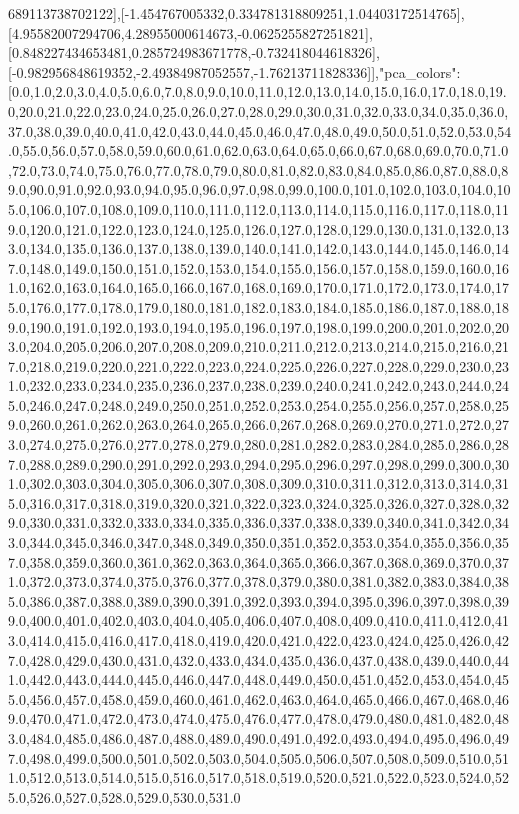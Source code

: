 \documentclass{article}
\begin{document}
689113738702122],[-1.454767005332,0.334781318809251,1.04403172514765],[4.95582007294706,4.28955000614673,-0.0625255827251821],[0.848227434653481,0.285724983671778,-0.732418044618326],[-0.982956848619352,-2.49384987052557,-1.76213711828336]],"pca_colors":[0.0,1.0,2.0,3.0,4.0,5.0,6.0,7.0,8.0,9.0,10.0,11.0,12.0,13.0,14.0,15.0,16.0,17.0,18.0,19.0,20.0,21.0,22.0,23.0,24.0,25.0,26.0,27.0,28.0,29.0,30.0,31.0,32.0,33.0,34.0,35.0,36.0,37.0,38.0,39.0,40.0,41.0,42.0,43.0,44.0,45.0,46.0,47.0,48.0,49.0,50.0,51.0,52.0,53.0,54.0,55.0,56.0,57.0,58.0,59.0,60.0,61.0,62.0,63.0,64.0,65.0,66.0,67.0,68.0,69.0,70.0,71.0,72.0,73.0,74.0,75.0,76.0,77.0,78.0,79.0,80.0,81.0,82.0,83.0,84.0,85.0,86.0,87.0,88.0,89.0,90.0,91.0,92.0,93.0,94.0,95.0,96.0,97.0,98.0,99.0,100.0,101.0,102.0,103.0,104.0,105.0,106.0,107.0,108.0,109.0,110.0,111.0,112.0,113.0,114.0,115.0,116.0,117.0,118.0,119.0,120.0,121.0,122.0,123.0,124.0,125.0,126.0,127.0,128.0,129.0,130.0,131.0,132.0,133.0,134.0,135.0,136.0,137.0,138.0,139.0,140.0,141.0,142.0,143.0,144.0,145.0,146.0,147.0,148.0,149.0,150.0,151.0,152.0,153.0,154.0,155.0,156.0,157.0,158.0,159.0,160.0,161.0,162.0,163.0,164.0,165.0,166.0,167.0,168.0,169.0,170.0,171.0,172.0,173.0,174.0,175.0,176.0,177.0,178.0,179.0,180.0,181.0,182.0,183.0,184.0,185.0,186.0,187.0,188.0,189.0,190.0,191.0,192.0,193.0,194.0,195.0,196.0,197.0,198.0,199.0,200.0,201.0,202.0,203.0,204.0,205.0,206.0,207.0,208.0,209.0,210.0,211.0,212.0,213.0,214.0,215.0,216.0,217.0,218.0,219.0,220.0,221.0,222.0,223.0,224.0,225.0,226.0,227.0,228.0,229.0,230.0,231.0,232.0,233.0,234.0,235.0,236.0,237.0,238.0,239.0,240.0,241.0,242.0,243.0,244.0,245.0,246.0,247.0,248.0,249.0,250.0,251.0,252.0,253.0,254.0,255.0,256.0,257.0,258.0,259.0,260.0,261.0,262.0,263.0,264.0,265.0,266.0,267.0,268.0,269.0,270.0,271.0,272.0,273.0,274.0,275.0,276.0,277.0,278.0,279.0,280.0,281.0,282.0,283.0,284.0,285.0,286.0,287.0,288.0,289.0,290.0,291.0,292.0,293.0,294.0,295.0,296.0,297.0,298.0,299.0,300.0,301.0,302.0,303.0,304.0,305.0,306.0,307.0,308.0,309.0,310.0,311.0,312.0,313.0,314.0,315.0,316.0,317.0,318.0,319.0,320.0,321.0,322.0,323.0,324.0,325.0,326.0,327.0,328.0,329.0,330.0,331.0,332.0,333.0,334.0,335.0,336.0,337.0,338.0,339.0,340.0,341.0,342.0,343.0,344.0,345.0,346.0,347.0,348.0,349.0,350.0,351.0,352.0,353.0,354.0,355.0,356.0,357.0,358.0,359.0,360.0,361.0,362.0,363.0,364.0,365.0,366.0,367.0,368.0,369.0,370.0,371.0,372.0,373.0,374.0,375.0,376.0,377.0,378.0,379.0,380.0,381.0,382.0,383.0,384.0,385.0,386.0,387.0,388.0,389.0,390.0,391.0,392.0,393.0,394.0,395.0,396.0,397.0,398.0,399.0,400.0,401.0,402.0,403.0,404.0,405.0,406.0,407.0,408.0,409.0,410.0,411.0,412.0,413.0,414.0,415.0,416.0,417.0,418.0,419.0,420.0,421.0,422.0,423.0,424.0,425.0,426.0,427.0,428.0,429.0,430.0,431.0,432.0,433.0,434.0,435.0,436.0,437.0,438.0,439.0,440.0,441.0,442.0,443.0,444.0,445.0,446.0,447.0,448.0,449.0,450.0,451.0,452.0,453.0,454.0,455.0,456.0,457.0,458.0,459.0,460.0,461.0,462.0,463.0,464.0,465.0,466.0,467.0,468.0,469.0,470.0,471.0,472.0,473.0,474.0,475.0,476.0,477.0,478.0,479.0,480.0,481.0,482.0,483.0,484.0,485.0,486.0,487.0,488.0,489.0,490.0,491.0,492.0,493.0,494.0,495.0,496.0,497.0,498.0,499.0,500.0,501.0,502.0,503.0,504.0,505.0,506.0,507.0,508.0,509.0,510.0,511.0,512.0,513.0,514.0,515.0,516.0,517.0,518.0,519.0,520.0,521.0,522.0,523.0,524.0,525.0,526.0,527.0,528.0,529.0,530.0,531.0
\end{document}
